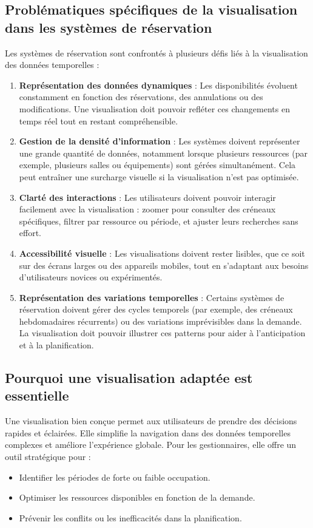\documentclass[runningheads]{llncs}
\begin{document}
\subsection{Problématiques spécifiques de la visualisation dans les systèmes de réservation}
Les systèmes de réservation sont confrontés à plusieurs défis liés à la visualisation des données temporelles :

\begin{enumerate}
    \item \textbf{Représentation des données dynamiques} : Les disponibilités évoluent constamment en fonction des réservations, des annulations ou des modifications. Une visualisation doit pouvoir refléter ces changements en temps réel tout en restant compréhensible.
    
    \item \textbf{Gestion de la densité d’information} : Les systèmes doivent représenter une grande quantité de données, notamment lorsque plusieurs ressources (par exemple, plusieurs salles ou équipements) sont gérées simultanément. Cela peut entraîner une surcharge visuelle si la visualisation n’est pas optimisée.
    
    \item \textbf{Clarté des interactions} : Les utilisateurs doivent pouvoir interagir facilement avec la visualisation : zoomer pour consulter des créneaux spécifiques, filtrer par ressource ou période, et ajuster leurs recherches sans effort.
    
    \item \textbf{Accessibilité visuelle} : Les visualisations doivent rester lisibles, que ce soit sur des écrans larges ou des appareils mobiles, tout en s’adaptant aux besoins d’utilisateurs novices ou expérimentés.
    
    \item \textbf{Représentation des variations temporelles} : Certains systèmes de réservation doivent gérer des cycles temporels (par exemple, des créneaux hebdomadaires récurrents) ou des variations imprévisibles dans la demande. La visualisation doit pouvoir illustrer ces patterns pour aider à l’anticipation et à la planification.
\end{enumerate}

\subsection{Pourquoi une visualisation adaptée est essentielle}
Une visualisation bien conçue permet aux utilisateurs de prendre des décisions rapides et éclairées. Elle simplifie la navigation dans des données temporelles complexes et améliore l'expérience globale. Pour les gestionnaires, elle offre un outil stratégique pour :
\begin{itemize}
    \item Identifier les périodes de forte ou faible occupation.
    \item Optimiser les ressources disponibles en fonction de la demande.
    \item Prévenir les conflits ou les inefficacités dans la planification.
\end{itemize}
\end{document}
